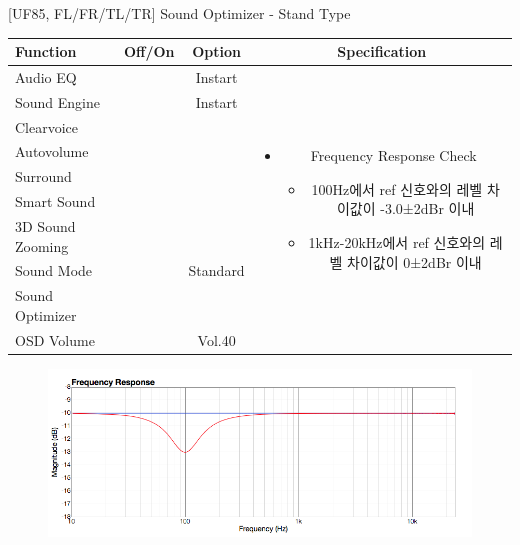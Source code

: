 \begin{frame}[t]{[UF85, FL/FR/TL/TR] Sound Optimizer - Stand Type}
\begin{tiny}
\begin{tabular}{@{}lccc@{}}
\toprule
Function & Off/On & Option & Specification \\
\midrule
Audio EQ & \color{black}{Off} & Instart &
\multirow{10}{60mm}{
\begin{itemize}
\item Frequency Response Check
	\begin{itemize}
	\item 100Hz에서 ref 신호와의 레벨 차이값이 -3.0±2dBr 이내
	\item 1kHz-20kHz에서 ref 신호와의 레벨 차이값이 0±2dBr 이내
	\end{itemize}
\end{itemize}
} \\
Sound Engine & \color{blue}{On} & Instart & \\
Clearvoice & \color{black}{Off} & & \\
Autovolume & \color{black}{Off} & & \\
Surround & \color{black}{Off} & & \\
Smart Sound & \color{black}{Off} & & \\
3D Sound Zooming & \color{black}{Off} & & \\
Sound Mode & \color{blue}{On} & Standard & \\
Sound Optimizer & \color{blue}{On} & \color{blue}{Standtype} & \\
OSD Volume & \color{blue}{On} & Vol.40 & \\
\midrule
\end{tabular}
\end{tiny}

\begin{figure}[b]
\includegraphics[height=0.4\textwidth]{figures/standtype.png}
\end{figure}

\end{frame}

